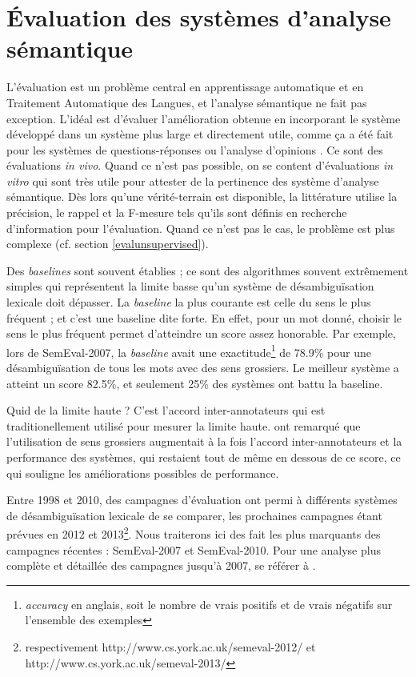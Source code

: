 
\section{Évaluation des systèmes d'analyse sémantique}
\label{evaluation}

L'évaluation est un problème central en apprentissage automatique et en
Traitement Automatique des Langues, et l'analyse sémantique ne fait pas
exception. L'idéal est d'évaluer l'amélioration obtenue en incorporant le
système développé dans un système plus large et directement utile, comme ça a
été fait pour les systèmes de questions-réponses \citep{shen2007using} ou
l'analyse d'opinions \citep{das2012structure}. Ce sont des évaluations
\textit{in vivo}. Quand ce n'est pas possible, on se content d'évaluations
\textit{in vitro} qui sont très utile pour attester de la pertinence des
système d'analyse sémantique. Dès lors qu'une vérité-terrain est disponible, la
littérature utilise la précision, le rappel et la F-mesure tels qu'ils sont
définis en recherche d'information pour l'évaluation. Quand ce n'est pas le
cas, le problème est plus complexe (cf. section \ref{evalunsupervised}).

Des \textit{baselines} sont souvent établies ; ce sont des algorithmes souvent
extrêmement simples qui représentent la limite basse qu'un système de
désambiguïsation lexicale doit dépasser. La \textit{baseline} la plus courante
est celle du sens le plus fréquent ; et c'est une baseline dite forte. En
effet, pour un mot donné, choisir le sens le plus fréquent permet d'atteindre
un score assez honorable. Par exemple, lors de SemEval-2007, la
\textit{baseline} avait une exactitude\footnote{\textit{accuracy} en anglais,
soit le nombre de vrais positifs et de vrais négatifs sur l'ensemble des
exemples} de 78.9\% pour une désambiguïsation de tous les mots avec des sens
grossiers. Le meilleur système a atteint un score 82.5\%, et seulement 25\% des
systèmes ont battu la baseline.

Quid de la limite haute ? C'est l'accord inter-annotateurs qui est
traditionellement utilisé pour mesurer la limite haute.
\cite{navigli2007semeval} ont remarqué que l'utilisation de sens grossiers
augmentait à la fois l'accord inter-annotateurs et la performance des systèmes,
qui restaient tout de même en dessous de ce score, ce qui souligne les
améliorations possibles de performance.

Entre 1998 et 2010, des campagnes d'évaluation ont permi à différents systèmes
de désambiguïsation lexicale de se comparer, les prochaines campagnes étant
prévues en 2012 et 2013\footnote{respectivement
http://www.cs.york.ac.uk/semeval-2012/ et
http://www.cs.york.ac.uk/semeval-2013/}. Nous traiterons ici des fait les plus
marquants des campagnes récentes : SemEval-2007 et SemEval-2010. Pour une
analyse plus complète et détaillée des campagnes jusqu'à 2007, se référer à
\cite{navigli2009word}.

